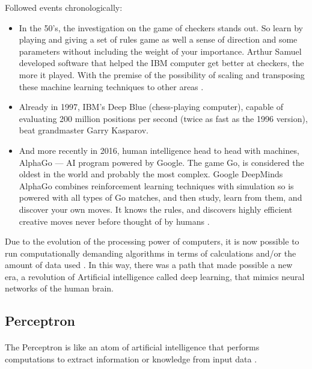 Followed events chronologically:
\begin{itemize}
    \item  In the 50's, the investigation on the game of checkers stands out.
    So learn by playing and giving a set of rules game as well a sense of direction and some parameters without including the weight of your importance.
    Arthur Samuel developed software that helped the IBM computer get better at checkers,  the more it played.
    With the premise of the possibility of scaling and transposing these machine learning techniques to other areas \cite{Samuel}.
    \item Already in 1997, IBM's Deep Blue (chess-playing computer), capable of evaluating 200 million positions per second (twice as fast as the 1996 version), beat grandmaster Garry Kasparov.
    \item And more recently in 2016, human intelligence head to head with machines, AlphaGo — AI program powered by Google. The game Go, is considered the oldest in the world and probably the most complex. Google DeepMinds AlphaGo combines reinforcement learning techniques with simulation so is powered with all types of Go matches, and then study, learn from them, and discover your own moves. It knows the rules, and discovers highly efficient creative moves never before thought of by humans \citet{Silver2017} .
    
    
\end{itemize}

\espaco
Due to the evolution of the processing power of computers, it is now possible to run computationally demanding algorithms in terms of calculations and/or the amount of data used \citet{history}.
In this way, there was a path that made possible a new era, a revolution
of Artificial intelligence
called deep learning,
that mimics neural networks
of the human brain.

\newpage
\subsection{Perceptron}

\paragraph{}The Perceptron is like an atom of artificial intelligence that performs computations to extract information or knowledge from input data \cite{Rosenblatt}.

